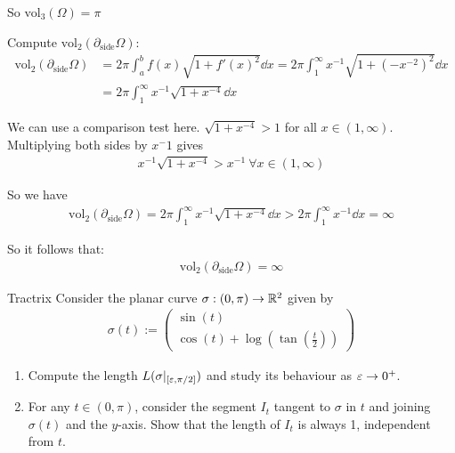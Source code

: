 \documentclass[12pt]{article}
\begin{document}
\begin{enumerate}
    So $\boxed{\mathrm{vol}_3(\Omega) = \pi}$

    Compute $\mathrm{vol}_2(\partial_{\text{side}}\Omega)$:
    \begin{align*}
        \mathrm{vol}_2(\partial_{\text{side}}\Omega) &= 2 \pi \int_{a}^{b} f(x) \sqrt{1 + f'(x)^2} \dd x = 2 \pi \int_{1}^{\infty} x^{-1} \sqrt{1 + (-x^{-2})^2} \dd x \\
        &= 2 \pi \int_{1}^{\infty} x^{-1} \sqrt{1 + x^{-4}} \dd x
    \end{align*}

    We can use a comparison test here. $\sqrt{1 + x^{-4}} > 1$ for all $x \in (1, \infty)$. Multiplying both sides by $x^-1$ gives
    \begin{align*}
        x^{-1}\sqrt{1 + x^{-4}} > x^{-1} \ \forall x \in (1, \infty)
    \end{align*}

    So we have
    \begin{align*}
        \mathrm{vol}_2(\partial_{\text{side}}\Omega) = 2 \pi \int_{1}^{\infty} x^{-1} \sqrt{1 + x^{-4}} \dd x > 2 \pi \int_{1}^{\infty} x^{-1} \dd x = \infty
    \end{align*}

    So it follows that:
    \begin{align*}
        \boxed{\mathrm{vol}_2(\partial_{\text{side}}\Omega) = \infty}
    \end{align*}
\end{enumerate}

\begin{problem}{Tractrix}{}
    Consider the planar curve $\sigma: (0, \pi) \rightarrow \mathbb{R}^2$ given by
    \begin{align*}
        \sigma(t) := 
        \begin{pmatrix}
            \sin(t) \\
            \cos(t) + \log(\tan(\frac{t}{2}))
        \end{pmatrix}
    \end{align*}

    \begin{enumerate}
        \item Compute the length $L(\sigma|_{[\varepsilon, \pi/2]})$ and study its behaviour as $\varepsilon \rightarrow 0^+$.
        \item For any $t \in (0, \pi)$, consider the segment $I_t$ tangent to $\sigma$ in $t$ and joining $\sigma(t)$ and the $y$-axis. Show that the length of $I_t$ is always 1, independent from $t$.
    \end{enumerate}
\end{problem}
\end{document}
